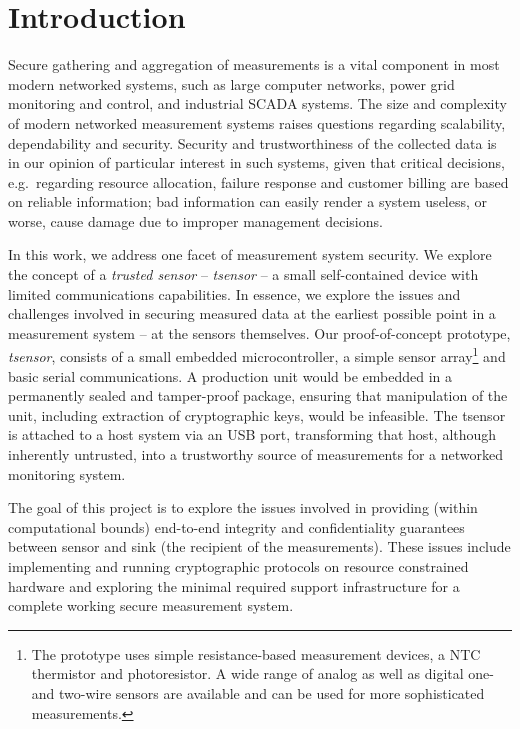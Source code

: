 
\chapter{Introduction}
\label{sec:intro}

Secure gathering and aggregation of measurements is a vital component in most modern networked systems, such as large computer networks, power grid monitoring and control, and industrial SCADA systems. The size and complexity of modern networked measurement systems raises questions regarding scalability, dependability and security. Security and trustworthiness of the collected data is in our opinion of particular interest in such systems, given that critical decisions, e.g.\ regarding resource allocation, failure response and customer billing are based on reliable information; bad information can easily render a system useless, or worse, cause damage due to improper management decisions.

In this work, we address one facet of measurement system security. We explore the concept of a \textit{trusted sensor} -- \textit{tsensor} -- a small self-contained device with limited communications capabilities. In essence, we explore the issues and challenges involved in securing measured data at the earliest possible point in a measurement system -- at the sensors themselves.
%
Our proof-of-concept prototype, \textit{tsensor}, consists of a small embedded microcontroller, a simple sensor array\footnote{The prototype uses simple resistance-based measurement devices, a NTC thermistor and photoresistor. A wide range of analog as well as digital one- and two-wire sensors are available and can be used for more sophisticated measurements.} and basic serial communications. A production unit would be embedded in a permanently sealed and tamper-proof package, ensuring that manipulation of the unit, including extraction of cryptographic keys, would be infeasible. 
The tsensor is attached to a host system via an USB port, transforming that host, although inherently untrusted, into a trustworthy source of measurements for a networked monitoring system.

The goal of this project is to explore the issues involved in providing (within computational bounds) end-to-end integrity and confidentiality guarantees between sensor and sink (the recipient of the measurements). These issues include implementing and running cryptographic protocols on resource constrained hardware and exploring the minimal required support infrastructure for a complete working secure measurement system.

